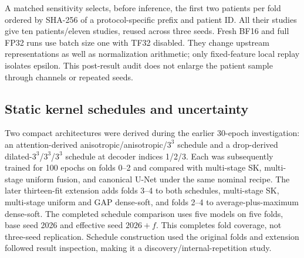 \documentclass[mathematics,article,submit,pdftex,moreauthors]{Definitions/mdpi}
\begin{document}
A matched sensitivity selects, before inference, the first two patients per
fold ordered by SHA-256 of a protocol-specific prefix and patient ID. All
their studies give ten patients/eleven studies, reused across three seeds.
Fresh BF16 and full FP32 runs use batch size one with TF32 disabled.
They change upstream representations as well as normalization arithmetic;
only fixed-feature local replay isolates epsilon. This post-result audit
does not enlarge the patient sample through channels or repeated seeds.

\subsection{Static kernel schedules and uncertainty}
Two compact architectures were derived during the earlier 30-epoch
investigation: an attention-derived anisotropic/anisotropic/$3^3$ schedule
and a drop-derived dilated-$3^3$/$3^3$/$3^3$ schedule at decoder indices
1/2/3. Each was subsequently trained for 100 epochs on folds 0--2 and
compared with multi-stage SK, multi-stage uniform fusion, and canonical
U-Net under the same nominal recipe. The later thirteen-fit extension adds
folds 3--4 to both schedules, multi-stage SK, multi-stage uniform and GAP
dense-soft, and folds 2--4 to average-plus-maximum dense-soft. The completed
schedule comparison uses five models on five folds, base seed 2026 and
effective seed $2026+f$. This completes fold coverage, not three-seed
replication. Schedule construction used the original folds and extension
followed result inspection, making it a discovery/internal-repetition study.
\end{document}
